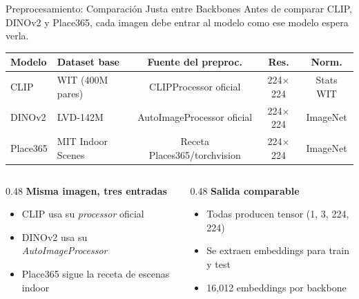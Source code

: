 \documentclass[aspectratio=169]{beamer}
\begin{document}
\begin{frame}{Preprocesamiento: Comparaci\'on Justa entre Backbones}
\footnotesize
\centering
{\small Antes de comparar CLIP, DINOv2 y Place365, cada imagen debe entrar al modelo como ese modelo espera verla.}

\vspace{0.08cm}
\begin{table}
\centering
\scriptsize
\begin{tabular}{@{}llccc@{}}
\toprule
\textbf{Modelo} & \textbf{Dataset base} & \textbf{Fuente del preproc.} & \textbf{Res.} & \textbf{Norm.} \\
\midrule
CLIP & WIT (400M pares) & CLIPProcessor oficial & 224$\times$224 & Stats WIT \\
DINOv2 & LVD-142M & AutoImageProcessor oficial & 224$\times$224 & ImageNet \\
Place365 & MIT Indoor Scenes & Receta Places365/torchvision & 224$\times$224 & ImageNet \\
\bottomrule
\end{tabular}
\end{table}

\vspace{0.08cm}
\begin{columns}[T,totalwidth=\textwidth]
\begin{column}{0.48\textwidth}
\textbf{Misma imagen, tres entradas}
\begin{itemize}
\item CLIP usa su \textit{processor} oficial
\item DINOv2 usa su \textit{AutoImageProcessor}
\item Place365 sigue la receta de escenas indoor
\end{itemize}
\end{column}

\begin{column}{0.48\textwidth}
\textbf{Salida comparable}
\begin{itemize}
\item Todas producen tensor (1, 3, 224, 224)
\item Se extraen embeddings para train y test
\item 16,012 embeddings por backbone
\end{itemize}
\end{column}
\end{columns}
\end{frame}
\end{document}
